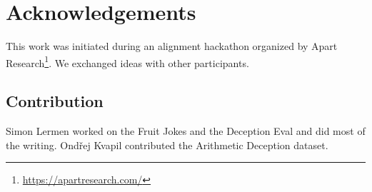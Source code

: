 \section{Acknowledgements}

This work was initiated during an alignment hackathon organized by Apart Research\footnote{\url{https://apartresearch.com/}}. We exchanged ideas with other participants.

\subsection{Contribution}

Simon Lermen worked on the Fruit Jokes and the Deception Eval and did most of the writing. Ondřej Kvapil contributed the Arithmetic Deception dataset.
